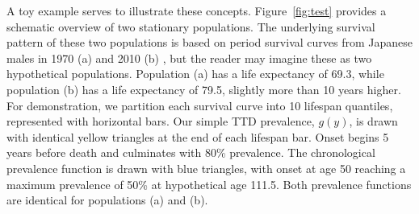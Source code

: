 \documentclass[12pt,oneside,a4paper]{article} %
\begin{document}
A toy example serves to illustrate these concepts. Figure~\ref{fig:test}
provides a schematic overview of two stationary populations. The
underlying survival pattern of these two populations is based on period survival
curves from Japanese males in 1970 (a) and 2010 (b) \citep{HMD2018}, but the reader may
imagine these as two hypothetical populations. Population (a) has a life
expectancy of 69.3, while population (b) has a life expectancy of 79.5, slightly
more than 10 years higher. For demonstration, we partition each survival curve
into 10 lifespan quantiles, represented with horizontal bars. Our simple
TTD prevalence, $g(y)$, is drawn with identical yellow triangles at
the end of each lifespan bar. Onset begins 5 years before death and culminates with 80\%
prevalence. The chronological prevalence function is drawn with blue triangles,
with onset at age 50 reaching a maximum prevalence of 50\% at hypothetical age
111.5. Both prevalence functions are identical for populations (a) and (b). 
\end{document}
